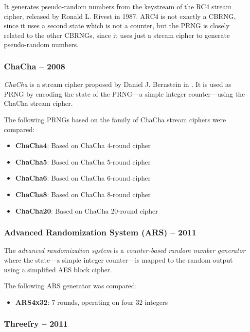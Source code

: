     It generates pseudo-random numbers from the keystream of the RC4 stream cipher, released by Ronald L. Rivest in 1987. ARC4 is not exactly a CBRNG, since it uses a second state which is not a counter, but the PRNG is closely related to the other CBRNGs, since it uses just a stream cipher to generate pseudo-random numbers.

\subsubsection[ChaCha -- 2008]{ChaCha -- 2008} \label{subsubsec:chacha}

    \emph{ChaCha} is a stream cipher proposed by Daniel J. Bernstein in \cite{Bernstein:2008}. It is used as PRNG by encoding the state of the PRNG---a simple integer counter---using the ChaCha stream cipher.

    The following PRNGs based on the family of ChaCha stream ciphers were compared:
    \begin{itemize}
        \itemsep0em
        \item \textbf{ChaCha4}: Based on ChaCha 4-round cipher
        \item \textbf{ChaCha5}: Based on ChaCha 5-round cipher
        \item \textbf{ChaCha6}: Based on ChaCha 6-round cipher
        \item \textbf{ChaCha8}: Based on ChaCha 8-round cipher
        \item \textbf{ChaCha20}: Based on ChaCha 20-round cipher
    \end{itemize}

\subsubsection[Advanced Randomization System (ARS) -- 2011]{Advanced Randomization System (ARS) -- 2011} \label{subsubsec:ars}

    The \emph{advanced randomization system} is a \emph{counter-based random number generator} where the state---a simple integer counter---is mapped to the random output using a simplified AES block cipher.

    The following ARS generator was compared:
    \begin{itemize}
		\itemsep0em
        \item \textbf{ARS4x32}: 7 rounds, operating on four \SI{32}{\bit} integers
    \end{itemize}

\subsubsection[Threefry -- 2011]{Threefry -- 2011} \label{subsubsec:threefry}

